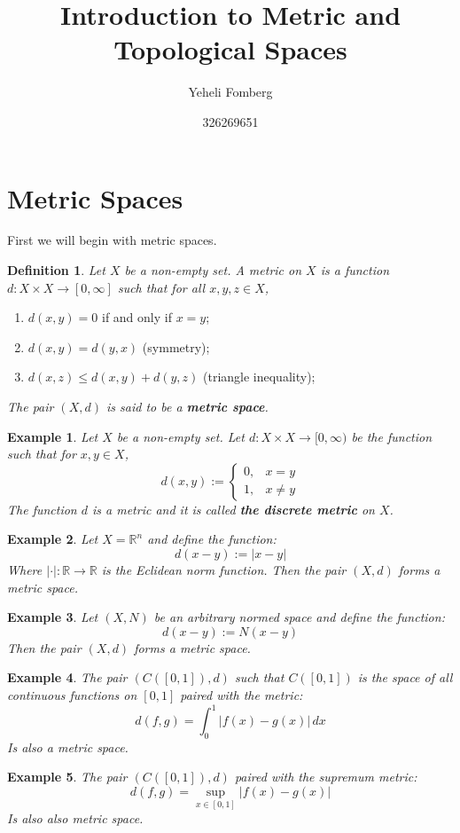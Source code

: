 \documentclass[11pt,a4paper]{article}
\title{\textbf{Introduction to Metric and Topological Spaces}}
\author{Yeheli Fomberg}
\date{326269651}
\theoremstyle{plain}
\newtheorem{definition}{Definition}[section]
\newtheorem{example}{Example}[section]
\newcommand{\R}{\mathbb{R}}
\begin{document}
	\maketitle
	\newpage
	\section{Metric Spaces}
	First we will begin with metric spaces.
	\begin{definition}
	Let $X$ be a non-empty set. A metric on $X$ is a function 
	$d \colon X \times X \to [0,\infty]$ such that for all $x,y,z \in X$,
	\end{definition}
	\begin{enumerate}
	\item $d(x,y) = 0$ if and only if $x = y$;
	\item $d(x,y) = d(y,x)$ (symmetry);
	\item $d(x,z) \le d(x,y) + d(y,z)$ (triangle inequality);
	\end{enumerate}
	\emph{The pair $(X,d)$ is said to be a \textbf{metric space}.}
	\begin{example}
	Let $X$ be a non-empty set. Let $d \colon X \times X \to [0,\infty)$ be
	the function such that for $x,y \in X$,
	\[
		d(x,y) := \begin{cases}
			0, & x=y \\
			1, & x \neq y
		\end{cases}
	\]
	The function $d$ is a metric and it is called \textbf{the discrete metric}
	on $X$.
	\end{example}
	\begin{example}
	Let $X = \R^n$ and define the function:
	\[
		d(x-y) := |x - y|
	\]
	Where $|\cdot | \colon \R \to \R$ is the Eclidean norm function. 
	Then the pair $(X, d)$ forms a metric space.
	\end{example}
	\begin{example}
	Let $(X, N)$ be an arbitrary normed space and define the function:
	\[
		d(x-y) := N(x - y)
	\] 
	Then the pair $(X, d)$ forms a metric space.
	\end{example}
	\begin{example}
	The pair $(C([0,1]), d)$ such that $C([0,1])$ is the space of all
	continuous functions on $[0,1]$ paired with the metric:
	\[
		d(f,g) = \int_{0}^{1}{|f(x) - g(x)|\,dx}
	\]
	Is also a metric space.
	\end{example}
	\begin{example}
	The pair $(C([0,1]), d)$ paired with the supremum metric:
	\[
		d(f,g) = \sup_{x \in [0,1]}{|f(x) - g(x)|}
	\]
	Is also also metric space.
	\end{example}
\end{document}
